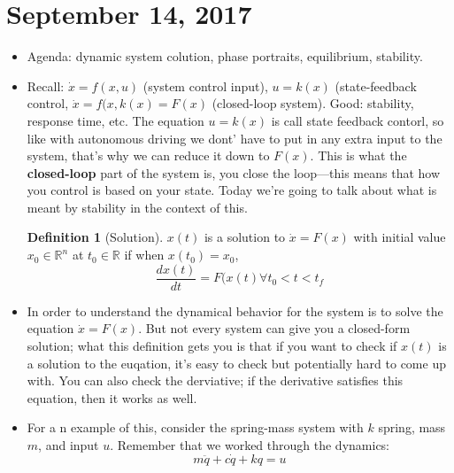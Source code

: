 \documentclass[12pt]{article}
\theoremstyle{definition}
\newtheorem{defn}{Definition}
\begin{document}
\section{September 14, 2017}
\begin{itemize}
    \itemsep0em 
    \item Agenda: dynamic system colution, phase portraits, equilibrium, stability.
    \item Recall: $\dot{x} = f(x, u)$ (system control input), $u = k(x)$ (state-feedback control, $\dot{x} = f(x, k(x) = F(x)$ (closed-loop system). Good: stability, response time, etc. The equation $u = k(x)$ is call state feedback contorl, so like with autonomous driving we dont' have to put in any extra input to the system, that's why we can reduce it down to $F(x)$. This is what the \textbf{closed-loop} part of the system is, you close the loop---this means that how you control is based on your state. Today we're going to talk about what is meant by stability in the context of this.
    \begin{defn}[Solution]
        $x(t)$ is a solution to $\dot{x} = F(x)$ with initial value $x_0 \in \mathbb{R}^n$ at $t_0 \in \mathbb{R}$ if when $x(t_0) = x_0$,
            $$\frac{d x(t)}{dt}= F(x(t) \forall t_0 < t < t_f$$
    \end{defn}
    \item In order to understand the dynamical behavior for the system is to solve the equation $\dot{x} = F(x)$. But not every system can give you a closed-form solution; what this definition gets you is that if you want to check if $x(t)$ is a solution to the euqation, it's easy to check but potentially hard to come up with. You can also check the derviative; if the derivative satisfies this equation, then it works as well.
    \item For a n example of this, consider the spring-mass system with $k$ spring, mass $m$, and input $u$. Remember that we worked through the dynamics:
    $$m\ddot{q} + c\dot{q} + kq = u$$

\end{itemize}
\end{document}
